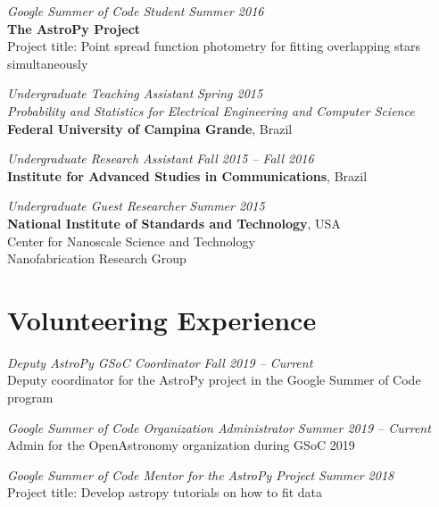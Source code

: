 \documentclass[10pt]{article}
\begin{document}
\begin{titlepage}
\emph{Google Summer of Code Student} \hfill \textit{Summer 2016}
\\\textbf{The AstroPy Project}
\\ Project title: Point spread function photometry for fitting overlapping stars simultaneously
\vspace{.5cm}

\emph{Undergraduate Teaching Assistant} \hfill \textit{Spring 2015}
\\\emph{Probability and Statistics for Electrical Engineering and Computer Science}
\\\textbf{Federal University of Campina Grande}, Brazil
\vspace{.5cm}

\emph{Undergraduate Research Assistant} \hfill \textit{Fall 2015 -- Fall 2016}
\\\textbf{Institute for Advanced Studies in Communications}, Brazil
\vspace{.5cm}

\emph{Undergraduate Guest Researcher} \hfill \textit{Summer 2015}
\\\textbf{National Institute of Standards and Technology}, USA
\\Center for Nanoscale Science and Technology
\\Nanofabrication Research Group
\vspace{.5cm}


\section*{Volunteering Experience}
\emph{Deputy AstroPy GSoC Coordinator} \hfill \textit{Fall 2019 -- Current}
\\Deputy coordinator for the AstroPy project in the Google Summer of Code program
\vspace{.5cm}

\emph{Google Summer of Code Organization Administrator} \hfill \textit{Summer 2019 -- Current}
\\Admin for the OpenAstronomy organization during GSoC 2019
\vspace{.5cm}

\emph{Google Summer of Code Mentor for the AstroPy Project} \hfill \textit{Summer 2018}
\\Project title: Develop astropy tutorials on how to fit data
\vspace{.5cm}



\end{titlepage}
\end{document}
